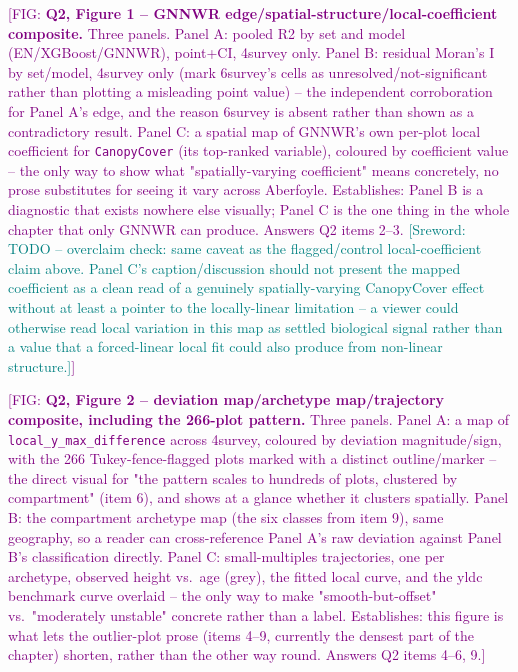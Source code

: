 \documentclass[logo,msc,ai]{infthesis}           %
\newcommand{\sr}[1]{\textcolor{teal}{[Sreword: #1]}}
\newcommand{\fig}[1]{\textcolor{purple}{[FIG: #1]}}
\begin{document}
\fig{\textbf{Q2, Figure 1 -- GNNWR edge/spatial-structure/local-coefficient
composite.} Three panels. Panel A: pooled R2 by set and model (EN/XGBoost/GNNWR),
point+CI, 4survey only. Panel B: residual Moran's I by set/model, 4survey only (mark
6survey's cells as unresolved/not-significant rather than plotting a misleading point
value) -- the independent corroboration for Panel A's edge, and the reason 6survey is
absent rather than shown as a contradictory result. Panel C: a spatial map of GNNWR's
own per-plot local
coefficient for \texttt{CanopyCover} (its top-ranked variable), coloured by
coefficient value -- the only way to show what "spatially-varying coefficient" means
concretely, no prose substitutes for seeing it vary across Aberfoyle. Establishes:
Panel B is a diagnostic that exists nowhere else visually; Panel C is the one thing in
the whole chapter that only GNNWR can produce. Answers Q2 items 2--3.
\sr{TODO -- overclaim check: same caveat as the flagged/control local-coefficient
claim above. Panel C's caption/discussion should not present the mapped coefficient
as a clean read of a genuinely spatially-varying CanopyCover effect without at least
a pointer to the locally-linear limitation -- a viewer could otherwise read local
variation in this map as settled biological signal rather than a value that a
forced-linear local fit could also produce from non-linear structure.}}

\fig{\textbf{Q2, Figure 2 -- deviation map/archetype map/trajectory composite,
including the 266-plot pattern.} Three panels. Panel A: a map of
\texttt{local\_y\_max\_difference} across 4survey, coloured by deviation
magnitude/sign, with the 266 Tukey-fence-flagged plots marked with a distinct
outline/marker -- the direct visual for "the pattern scales to hundreds of plots,
clustered by compartment" (item 6), and shows at a glance whether it clusters
spatially. Panel B: the compartment archetype map (the six classes from item 9), same
geography, so a reader can cross-reference Panel A's raw deviation against Panel B's
classification directly. Panel C: small-multiples trajectories, one per archetype,
observed height vs.\ age (grey), the fitted local curve, and the yldc benchmark curve
overlaid -- the only way to make "smooth-but-offset" vs.\ "moderately unstable"
concrete rather than a label. Establishes: this figure is what lets the outlier-plot
prose (items 4--9, currently the densest part of the chapter) shorten, rather than the
other way round. Answers Q2 items 4--6, 9.}
\end{document}
